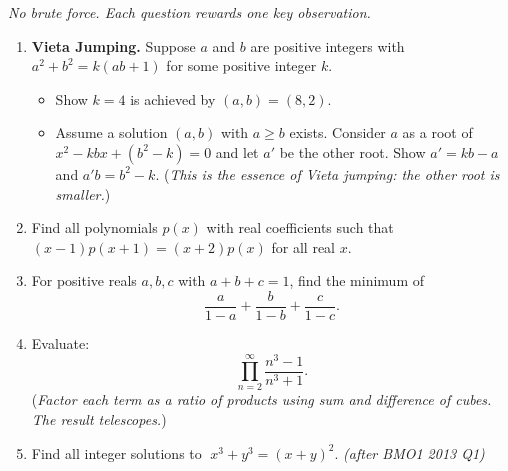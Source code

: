 \documentclass[11pt,a4paper]{article}
\begin{document}
\noindent\textit{No brute force. Each question rewards one key observation.}

\begin{enumerate}

\item \textbf{Vieta Jumping.}
      Suppose $a$ and $b$ are positive integers with $a^2 + b^2 = k(ab + 1)$
      for some positive integer $k$.
      \begin{itemize}[leftmargin=*,itemsep=2pt]
        \item[(a)] Show $k = 4$ is achieved by $(a,b) = (8,2)$.
        \item[(b)] Assume a solution $(a,b)$ with $a \geq b$ exists.
                   Consider $a$ as a root of $x^2 - kbx + (b^2-k) = 0$
                   and let $a'$ be the other root. Show $a' = kb - a$ and $a'b = b^2 - k$.
                   (\textit{This is the essence of Vieta jumping: the other root is smaller.})
      \end{itemize}

\item Find all polynomials $p(x)$ with real coefficients such that
      $(x-1)p(x+1) = (x+2)p(x)$ for all real $x$.

\item For positive reals $a, b, c$ with $a + b + c = 1$, find the minimum of
\[
  \frac{a}{1-a} + \frac{b}{1-b} + \frac{c}{1-c}.
\]

\item Evaluate:
\[
  \prod_{n=2}^{\infty}\frac{n^3-1}{n^3+1}.
\]
(\textit{Factor each term as a ratio of products using sum and difference of cubes.
The result telescopes.})

\item Find all integer solutions to $\;x^3 + y^3 = (x+y)^2$. \textit{\small(after BMO1 2013 Q1)}

\end{enumerate}

\end{document}
